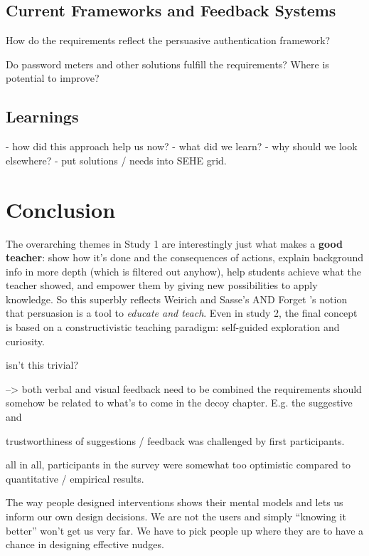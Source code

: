 
\subsection{Current Frameworks and Feedback Systems}
How do the requirements reflect the persuasive authentication framework?

Do password meters and other solutions fulfill the requirements?
Where is potential to improve?

\subsection{Learnings}

- how did this approach help us now?
- what did we learn?
- why should we look elsewhere?
- put solutions / needs into SEHE grid.

\section{Conclusion}
The overarching themes in Study 1 are interestingly just what makes a \textbf{good teacher}: show how it's done and the consequences of actions, explain background info in more depth (which is filtered out anyhow), help students achieve what the teacher showed, and empower them by giving new possibilities to apply knowledge. So this superbly reflects Weirich and Sasse's AND Forget \etal's notion that persuasion is a tool to \textit{educate and teach}. 
Even in study 2, the final concept is based on a constructivistic teaching paradigm: self-guided exploration and curiosity.

isn't this trivial?


--> both verbal and visual feedback need to be combined
the requirements should somehow be related to what's to come in the decoy chapter. E.g. the suggestive and 

trustworthiness of suggestions / feedback was challenged by first participants.


all in all, participants in the survey were somewhat too optimistic compared to quantitative / empirical results.

The way people designed interventions shows their mental models and lets us inform our own design decisions. We are not the users and simply ``knowing it better'' won't get us very far. We have to pick people up where they are to have a chance in designing effective nudges. 


